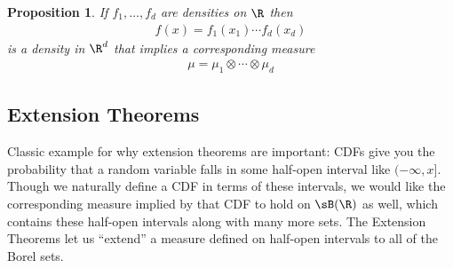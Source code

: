 \documentclass[12pt]{article}
\theoremstyle{plain}
\newtheorem{prop}[thm]{Proposition}
\theoremstyle{definition}
\theoremstyle{remark}
\begin{document}
\begin{prop}
If $f_1,\ldots,f_d$ are densities on $\R$ then
\begin{align*}
  f(x) = f_1(x_1) \cdots f_d(x_d)
\end{align*}
is a density in $\R^d$ that implies a corresponding measure
\begin{align*}
  \mu = \mu_1\otimes \cdots \otimes \mu_d
\end{align*}
\end{prop}



\clearpage
\subsection{Extension Theorems}

Classic example for why extension theorems are important: CDFs give you
the probability that a random variable falls in some half-open interval
like $(-\infty,x]$. Though we naturally define a CDF in terms of these
intervals, we would like the corresponding measure implied by that
CDF to hold on $\sB(\R)$ as well, which contains these half-open
intervals along with many more sets. The Extension Theorems let us
``extend'' a measure defined on half-open intervals to all of the Borel
sets.
\end{document}
